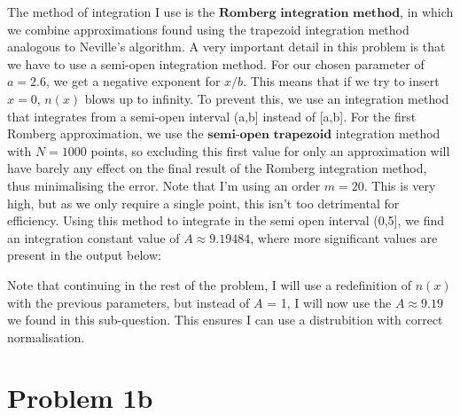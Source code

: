 The method of integration I use is the $\textbf{Romberg integration method}$, in which we combine approximations found using the trapezoid integration method analogous to Neville's algorithm. A very important detail in this problem is that we have to use a semi-open integration method. For our chosen parameter of $a = 2.6$, we get a negative exponent for $x/b$. This means that if we try to insert $x = 0$, $n(x)$ blows up to infinity. To prevent this, we use an integration method that integrates from a semi-open interval (a,b] instead of [a,b]. For the first Romberg approximation, we use the $\textbf{semi-open trapezoid}$ integration method with $N =1000$ points, so excluding this first value for only an approximation will have barely any effect on the final result of the Romberg integration method, thus minimalising the error. Note that I'm using an order $m=20$. This is very high, but as we only require a single point, this isn't too detrimental for efficiency. Using this method to integrate in the semi open interval (0,5], we find an integration constant value of $A \approx 9.19484$, where more significant values are present in the output below: 

%

Note that continuing in the rest of the problem, I will use a redefinition of $n(x)$ with the previous parameters, but instead of $A$ = 1, I will now use the $A \approx 9.19$ we found in this sub-question. This ensures I can use a distrubition with correct normalisation. 

\section*{Problem 1b}

